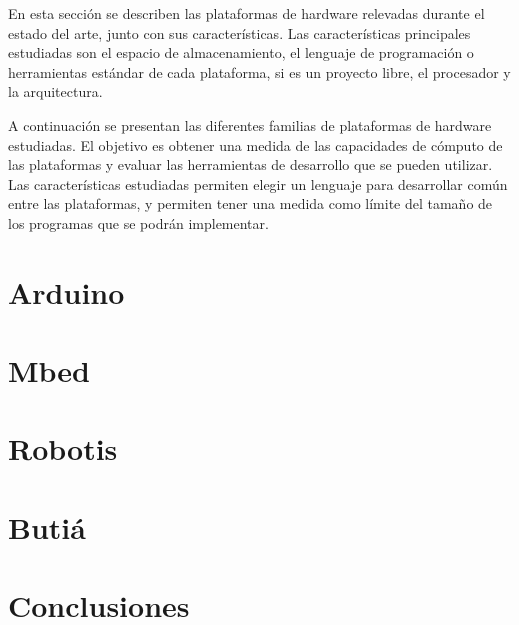 
  En esta sección se describen las plataformas de hardware relevadas
durante el estado del arte, junto con sus características.
  Las características principales estudiadas 
  son el espacio de almacenamiento,
el lenguaje de programación o herramientas estándar de cada
plataforma, si es un proyecto libre, el procesador y la arquitectura.

  A continuación se presentan las diferentes familias de plataformas
de hardware estudiadas.
  El objetivo es obtener una medida de las capacidades de cómputo de
las plataformas y evaluar las herramientas de desarrollo que se pueden
utilizar.
  Las características estudiadas permiten elegir un lenguaje para
desarrollar común entre las plataformas, y permiten tener una medida
como límite del tamaño de los programas que se podrán implementar.

\section{Arduino}


\section{Mbed}


\section{Robotis}


%

%

\section{Butiá}


%

\section{Conclusiones}

